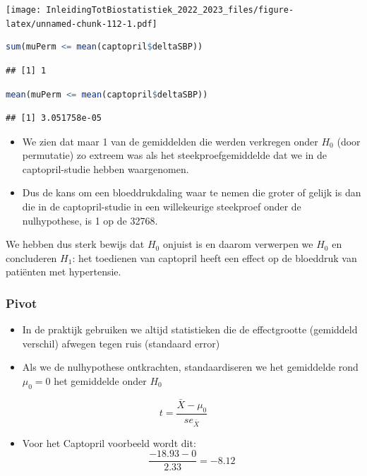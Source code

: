 \documentclass[
  12pt,dutch,coursenotes]{book}
\providecommand{\tightlist}{%
  \setlength{\itemsep}{0pt}\setlength{\parskip}{0pt}}
\begin{document}
\texttt{[image: InleidingTotBiostatistiek\_2022\_2023\_files/figure-latex/unnamed-chunk-112-1.pdf]}

\begin{lstlisting}[language=R]
sum(muPerm <= mean(captopril$deltaSBP))
\end{lstlisting}

\begin{lstlisting}
## [1] 1
\end{lstlisting}

\begin{lstlisting}[language=R]
mean(muPerm <= mean(captopril$deltaSBP))
\end{lstlisting}

\begin{lstlisting}
## [1] 3.051758e-05
\end{lstlisting}

\begin{itemize}
\item
  We zien dat maar 1 van de gemiddelden die werden verkregen onder \(H_0\) (door permutatie) zo extreem was als het steekproefgemiddelde dat we in de captopril-studie hebben waargenomen.
\item
  Dus de kans om een bloeddrukdaling waar te nemen die groter of gelijk is dan die in de captopril-studie in een willekeurige steekproef onder de nulhypothese, is 1 op de 32768.
\end{itemize}

We hebben dus sterk bewijs dat \(H_0\) onjuist is en daarom verwerpen we \(H_0\) en concluderen \(H_1\): het toedienen van captopril heeft een effect op de bloeddruk van patiënten met hypertensie.

\hypertarget{pivot}{%
\subsubsection{Pivot}\label{pivot}}

\begin{itemize}
\item
  In de praktijk gebruiken we altijd statistieken die de effectgrootte (gemiddeld verschil) afwegen tegen ruis (standaard error)
\item
  Als we de nulhypothese ontkrachten, standaardiseren we het gemiddelde rond \(\mu_0 = 0\) het gemiddelde onder \(H_0\)
\end{itemize}

\[t=\frac{\bar X-\mu_0}{se_{\bar X}}\]

\begin{itemize}
\tightlist
\item
  Voor het Captopril voorbeeld wordt dit:
  \[\frac{-18.93-0}{2.33}=-8.12\]
\end{itemize}
\end{document}

